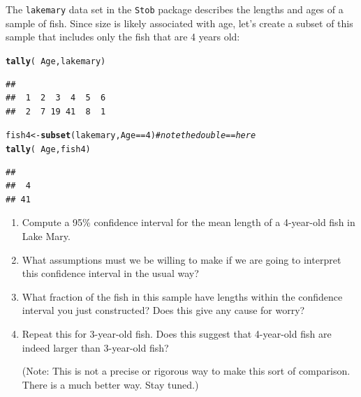 \documentclass[twoside]{book}\usepackage[]{graphicx}\usepackage[]{xcolor}
\makeatletter
\newcommand{\hlnum}[1]{\textcolor[rgb]{0.686,0.059,0.569}{#1}}%
\newcommand{\hlcom}[1]{\textcolor[rgb]{0.678,0.584,0.686}{\textit{#1}}}%
\newcommand{\hlopt}[1]{\textcolor[rgb]{0,0,0}{#1}}%
\newcommand{\hlstd}[1]{\textcolor[rgb]{0.345,0.345,0.345}{#1}}%
\newcommand{\hlkwb}[1]{\textcolor[rgb]{0.69,0.353,0.396}{#1}}%
\newcommand{\hlkwd}[1]{\textcolor[rgb]{0.737,0.353,0.396}{\textbf{#1}}}%
\newenvironment{kframe}{%
 \def\at@end@of@kframe{}%
 \ifinner\ifhmode%
  \def\at@end@of@kframe{\end{minipage}}%
  \begin{minipage}{\columnwidth}%
 \fi\fi%
 \def\FrameCommand##1{\hskip\@totalleftmargin \hskip-\fboxsep
 \colorbox{shadecolor}{##1}\hskip-\fboxsep
     \hskip-\linewidth \hskip-\@totalleftmargin \hskip\columnwidth}%
 \MakeFramed {\advance\hsize-\width
   \@totalleftmargin\z@ \linewidth\hsize
   \@setminipage}}%
 {\par\unskip\endMakeFramed%
 \at@end@of@kframe}
\newenvironment{knitrout}{}{} %
\newcommand{\Rindex}[1]{\index{\texttt{#1}}}
\newcommand{\dataframe}[1]{{\color{blue!80!black}\texttt{#1}}\Rindex{#1}}
\newcommand{\pkg}[1]{{\color{red!80!black}\texttt{#1}}\Rindex{#1}}
\makeatother
\begin{document}
\begin{problem}
	The \dataframe{lakemary} data set in the \pkg{Stob} package describes the 
	lengths and ages of a sample of fish.  Since size is likely associated with
	age, let's create a subset of this sample that includes only the fish 
	that are 4 years old:
\begin{knitrout}
\color{fgcolor}\begin{kframe}
\begin{alltt}
\hlkwd{tally}\hlstd{(}\hlopt{~}\hlstd{Age, lakemary)}
\end{alltt}
\begin{verbatim}
## 
##  1  2  3  4  5  6 
##  2  7 19 41  8  1
\end{verbatim}
\begin{alltt}
\hlstd{fish4} \hlkwb{<-} \hlkwd{subset}\hlstd{(lakemary, Age} \hlopt{==} \hlnum{4}\hlstd{)}  \hlcom{# note the double == here}
\hlkwd{tally}\hlstd{(}\hlopt{~}\hlstd{Age, fish4)}
\end{alltt}
\begin{verbatim}
## 
##  4 
## 41
\end{verbatim}
\end{kframe}
\end{knitrout}
	\begin{enumerate}
		\item
			Compute a 95\% confidence interval for the mean length 
			of a 4-year-old fish in Lake Mary.
		\item
			What assumptions must we be willing to make if we are 
			going to interpret this confidence interval in the usual way?
		\item
			What fraction of the fish in this sample have lengths within
			the confidence interval you just constructed?  Does this give 
			any cause for worry?
		\item
			Repeat this for 3-year-old fish.  Does this suggest that 
			4-year-old fish are indeed larger than 3-year-old fish?  
			
			(Note: This is not a precise or rigorous way to make this sort of comparison.
			There is a much better way. Stay tuned.)
	\end{enumerate}
\end{problem}
\end{document}
